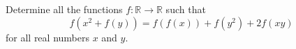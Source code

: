 Determine all the functions $f : \mathbb{R} \to \mathbb{R}$ such that\[ f(x^2 + f(y)) = f(f(x)) + f(y^2) + 2f(xy) \]for all real numbers $x$ and $y$.